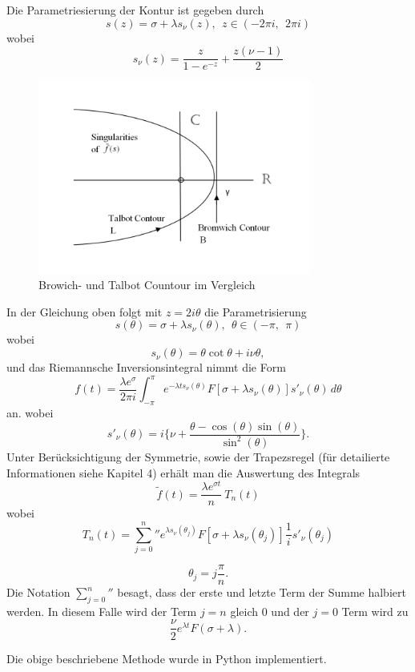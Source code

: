 Die Parametriesierung der Kontur ist gegeben durch
\[
s(z) = \sigma+\lambda s_{\nu}(z),~~ z\in (-2\pi i,~~2\pi i)
\]
wobei
\[
s_{\nu}(z)=\frac{z}{1-e^{-z}}+\frac{z(\nu-1)}{2}
\]
\begin{figure}
\centering
\includegraphics[width=0.8\textwidth]{papers/laplace/Bromwich_Talbot_Contour.PNG}
\caption{Browich- und Talbot Countour im Vergleich
\label{laplace:figure:countours}}
\end{figure}

In der Gleichung oben folgt mit $z=2i\theta$ die Parametrisierung
\[
s(\theta) = \sigma+\lambda s_{\nu}(\theta),~~ \theta\in (-\pi ,~~\pi)
\]
wobei
\[
s_{\nu}(\theta)=\theta \cot\theta+i\nu\theta,
\]
und das Riemannsche Inversionsintegral nimmt die Form 
\[
f(t)=\frac{\lambda e^{\sigma}}{2\pi i}\int_{-\pi}^{\pi} e^{-\lambda ts_{\nu}(\theta)}F[\sigma + \lambda s_{\nu}(\theta)]s'_{\nu}(\theta)\,d\theta
\]
an.
wobei
\[
s'_{\nu}(\theta) = i \Biggl\{\nu + \frac{\theta-\cos(\theta)\sin(\theta)}{\sin^{2}(\theta)}  \Biggr\}.
\]
Unter Berücksichtigung der Symmetrie, sowie der Trapezsregel (für detailierte Informationen siehe Kapitel 4) erhält man die Auswertung des Integrals
\[
\tilde{f}(t) = \frac{\lambda e^{\sigma t}}{n}~T_{n}(t)
\]
wobei 
\[
T_{n}(t)
=
{\sum_{j=0}^n}'' e^{\lambda s_{\nu}(\theta_{j})}
F[\sigma + \lambda s_{\nu}(\theta_{j})]
\frac{1}{i} s'_{\nu}(\theta_{j})
\]
\cite{laplace:talbot}

\[
\theta_{j} = j \frac{\pi}{n}.
\]
Die Notation ${\sum_{j=0}^n}''$ besagt, dass der erste und letzte
Term der Summe halbiert werden.
In diesem Falle wird der Term $j=n$ gleich 0 und der $j=0$ Term wird zu
\[
\frac{\nu}{2}e^{\lambda t}F(\sigma + \lambda).
\]


Die obige beschriebene Methode wurde in Python implementiert.

